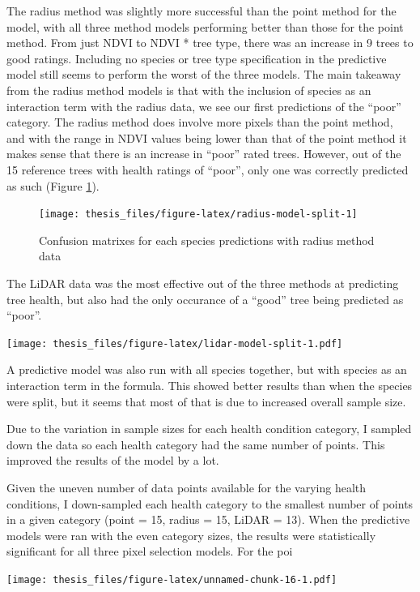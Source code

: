 \documentclass[12pt,twoside]{reedthesis}
\begin{document}
The radius method was slightly more successful than the point method for the model, with all three method models performing better than those for the point method. From just NDVI to NDVI * tree type, there was an increase in 9 trees to good ratings. Including no species or tree type specification in the predictive model still seems to perform the worst of the three models. The main takeaway from the radius method models is that with the inclusion of species as an interaction term with the radius data, we see our first predictions of the ``poor'' category. The radius method does involve more pixels than the point method, and with the range in NDVI values being lower than that of the point method it makes sense that there is an increase in ``poor'' rated trees. However, out of the 15 reference trees with health ratings of ``poor'', only one was correctly predicted as such (Figure \ref{fig:radius-model-split}).
\begin{figure}
\texttt{[image: thesis\_files/figure-latex/radius-model-split-1]} \caption[Confusion matrixes for Radius data model]{Confusion matrixes for each species predictions with radius method data}\label{fig:radius-model-split}
\end{figure}
The LiDAR data was the most effective out of the three methods at predicting tree health, but also had the only occurance of a ``good'' tree being predicted as ``poor''.

\texttt{[image: thesis\_files/figure-latex/lidar-model-split-1.pdf]}

A predictive model was also run with all species together, but with species as an interaction term in the formula. This showed better results than when the species were split, but it seems that most of that is due to increased overall sample size.

Due to the variation in sample sizes for each health condition category, I sampled down the data so each health category had the same number of points. This improved the results of the model by a lot.

Given the uneven number of data points available for the varying health conditions, I down-sampled each health category to the smallest number of points in a given category (point = 15, radius = 15, LiDAR = 13). When the predictive models were ran with the even category sizes, the results were statistically significant for all three pixel selection models. For the poi

\texttt{[image: thesis\_files/figure-latex/unnamed-chunk-16-1.pdf]}
\end{document}
